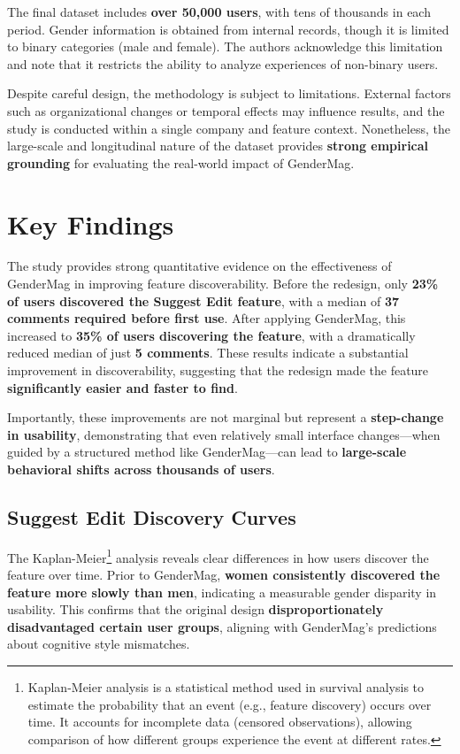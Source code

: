 The final dataset includes \textbf{over 50,000 users}, with tens of thousands in each period. Gender information is obtained from internal records, though it is limited to binary categories (male and female). The authors acknowledge this limitation and note that it restricts the ability to analyze experiences of non-binary users.

Despite careful design, the methodology is subject to limitations. External factors such as organizational changes or temporal effects may influence results, and the study is conducted within a single company and feature context. Nonetheless, the large-scale and longitudinal nature of the dataset provides \textbf{strong empirical grounding} for evaluating the real-world impact of GenderMag.

\section{Key Findings}
The study provides strong quantitative evidence on the effectiveness of GenderMag in improving feature discoverability. Before the redesign, only \textbf{23\% of users discovered the Suggest Edit feature}, with a median of \textbf{37 comments required before first use}. After applying GenderMag, this increased to \textbf{35\% of users discovering the feature}, with a dramatically reduced median of just \textbf{5 comments}. These results indicate a substantial improvement in discoverability, suggesting that the redesign made the feature \textbf{significantly easier and faster to find}.

Importantly, these improvements are not marginal but represent a \textbf{step-change in usability}, demonstrating that even relatively small interface changes—when guided by a structured method like GenderMag—can lead to \textbf{large-scale behavioral shifts across thousands of users}.

\subsection{Suggest Edit Discovery Curves}
The Kaplan-Meier\footnote{Kaplan-Meier analysis is a statistical method used in survival analysis to estimate the probability that an event (e.g., feature discovery) occurs over time. It accounts for incomplete data (censored observations), allowing comparison of how different groups experience the event at different rates.
} analysis reveals clear differences in how users discover the feature over time. Prior to GenderMag, \textbf{women consistently discovered the feature more slowly than men}, indicating a measurable gender disparity in usability. This confirms that the original design \textbf{disproportionately disadvantaged certain user groups}, aligning with GenderMag’s predictions about cognitive style mismatches.

